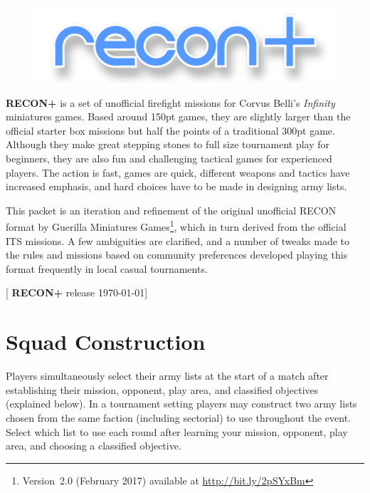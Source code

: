 \documentclass[14pt,dvipsnames]{extarticle}
\newcommand{\reconplus}{\textbf{RECON+}\xspace}
\newcommand\BackgroundPic[1]{%
\put(0,0){%
\parbox[b][\paperheight]{\paperwidth}{%
\vfill%
\centering%
\texttt{[image: \#1]}%
\vfill%
}}}
\newcommand{\setbackground}{%
\AddToShipoutPicture{\BackgroundPic{art/background/background.pdf}}%
}
\begin{document}
\thispagestyle{empty}


\clearpage

\setcounter{page}{1}

\begin{figure}[t!]
  \centering
  \includegraphics{art/cover/title.pdf}  
\end{figure}

  
\noindent\reconplus is a set of unofficial firefight missions for Corvus Belli's
\emph{Infinity} miniatures games.  Based around 150pt games, they are
slightly larger than the official starter box missions but half the
points of a traditional 300pt game.  Although they make great stepping
stones to full size tournament play for beginners, they are also fun
and challenging tactical games for experienced players. The action is
fast, games are quick, different weapons and tactics have increased
emphasis, and hard choices have to be made in designing army lists.

This packet is an iteration and refinement of the original unofficial
RECON format by Guerilla Miniatures Games\footnote{Version~2.0
  (February 2017) available at \url{http://bit.ly/2pSYxBm}}, which in
turn derived from the official ITS missions.  A few ambiguities are
clarified, and a number of tweaks made to the rules and missions based
on community preferences developed playing this format frequently in
local casual tournaments.

\tableofcontents

\vfill

\hfill{\small[ \reconplus release \today ]}

\clearpage
{}

\section{Squad Construction}

Players simultaneously select their army lists at the start of a match
after establishing their mission, opponent, play area, and classified
objectives (explained below).  In a tournament setting players may
construct two army lists chosen from the same faction (including
sectorial) to use throughout the event.  Select which list to use each
round after learning your mission, opponent, play area, and choosing a
classified objective.
\end{document}
